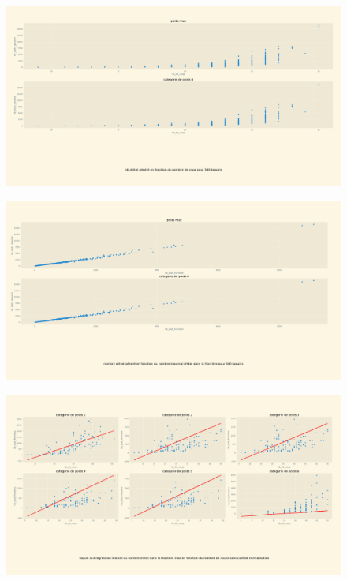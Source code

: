 \documentclass[a4paper, 12pt]{article}
\begin{document}
\begin{figure}[H]
    \centering
    \includegraphics[width=\textwidth]{Taquin 3x3 nombre d'etats generer en fct du nb de coups}
\end{figure}
\begin{figure}[H]
    \centering
    \includegraphics[width=\textwidth]{Taquin 3x3 nombre d'etats generer en fct du nb max detat dans la frontiere}
\end{figure}
\begin{figure}[H]
    \centering
    \includegraphics[width=\textwidth]{Taquin 3x3 regression lineaire du nombre d'état dans la frontière max en fonction du nombre de coups sans coef de normalisation}
\end{figure}
\end{document}
